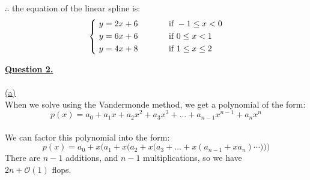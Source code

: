 \documentclass[12pt]{article}
\begin{document}
$\therefore$ the equation of the linear spline is:
$$
    \left\{
    \begin{aligned}
        \ y=2x + 6 & \hspace*{13mm} \text{if } -1 \leq x < 0   \\
        \ y=6x + 6 & \hspace*{13mm} \text{if } 0 \leq x < 1    \\
        \ y=4x + 8 & \hspace*{13mm} \text{if } 1 \leq x \leq 2 \\
    \end{aligned}
    \right.
$$

\newpage
{\LARGE \underline{\textbf{Question 2.}}}\\
~\\\hyperlink{toc}{\hypertarget{2.1}{(a)}}\\
When we solve using the Vandermonde method, we get a polynomial of the form:\\
$$p(x) = a_0 + a_1x + a_2{x}^2 + a_3{x}^3 + \ldots + a_{n-1}{x}^{n-1} + a_{n}{x}^{n}$$\\

We can factor this polynomial into the form:
$$p(x) = a_0 + x\bigg(a_1 + x \Big(a_2 + x\big(a_3 + \ldots + x(a_{n-1} + xa_n) \cdots \big)\Big)\bigg)$$
There are $n-1$ additions, and $n-1$ multiplications, so we have\\
$2n + \mathcal{O}(1)$ flops.



\end{document}
